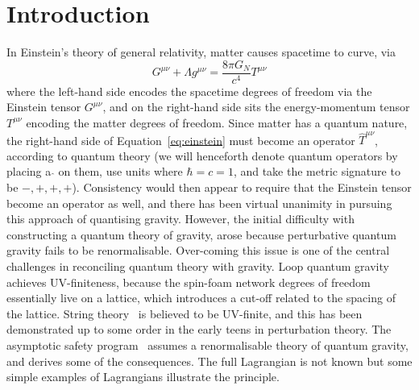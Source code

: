 \documentclass[aps,preprintnumbers,superscriptaddress,longbibliography]{revtex4-1}
\begin{document}
\maketitle 




\section{Introduction}
\label{sec: intro}


In Einstein's theory of general relativity, matter causes spacetime to curve, via 
\begin{equation}
\label{eq:einstein}
G^{\mu\nu}+\Lambda g^{\mu\nu}=\frac{8\pi G_N}{c^4}T^{\mu\nu}
\end{equation}
where the left-hand side encodes the spacetime degrees of freedom via the Einstein tensor $G^{\mu\nu}$, and on the right-hand side sits the energy-momentum tensor $T^{\mu\nu}$ encoding the matter degrees of freedom. Since matter has a quantum nature, the right-hand side of Equation~\eqref{eq:einstein}  must become an operator $\hat{T}^{\mu\nu}$, according to quantum theory (we will henceforth denote quantum operators by placing a $\hat{}$ on them, use units where $\hbar=c=1$, and take the metric signature to be $-,+,+,+$). Consistency would then appear to require that the Einstein tensor become an operator as well, and there has been virtual unanimity in pursuing this approach of quantising gravity. However, the initial difficulty with constructing a quantum theory of gravity, arose because perturbative quantum gravity fails to be renormalisable. Over-coming this issue is one of the central challenges in reconciling quantum theory with gravity. Loop quantum gravity~\cite{sen1982gravity,ashtekar1986new,rovelli1988knot,rovelli2004quantum} achieves UV-finiteness, because the spin-foam network degrees of freedom essentially live on a lattice, which introduces a cut-off related to the spacing of the lattice. String theory~\cite{veneziano1968construction,polchinski2005string,Green:1987sp,green2012superstring} is believed to be UV-finite, and this has been demonstrated up to some order in the early teens in perturbation theory. %
The asymptotic safety program~\cite{weinberg1979ultraviolet} assumes a renormalisable theory of quantum gravity, and derives some of the consequences. The full Lagrangian is not known but some simple examples of Lagrangians illustrate the principle.
\end{document}
